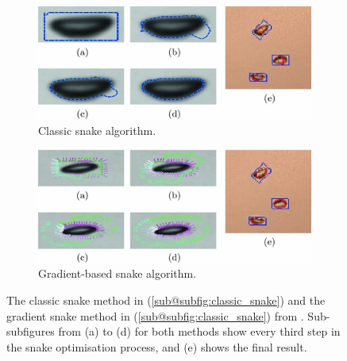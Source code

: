 \begin{figure}[H]
    \centering
    \begin{subfigure}{.49\textwidth}
        \centering
        \includegraphics[width=1\linewidth]{assets/classic_snake.png}
        \caption{Classic snake algorithm.}
        \label{subfig:classic_snake}
    \end{subfigure}
    \hfill
    \begin{subfigure}{.49\textwidth}
        \centering
        \includegraphics[width=1\linewidth]{assets/gradient_snake.png}
        \caption{Gradient-based snake algorithm.}
        \label{subfig:gradient_snake}
    \end{subfigure}
    \caption{The classic snake method in (\ref{sub@subfig:classic_snake}) and the gradient snake method in (\ref{sub@subfig:classic_snake}) from \cite{zelenkaGasBubbleShape2014a}. Sub-subfigures from (a) to (d) for both methods show every third step in the snake optimisation process, and (e) shows the final result.}
    \label{fig:snake_methods}
\end{figure}

